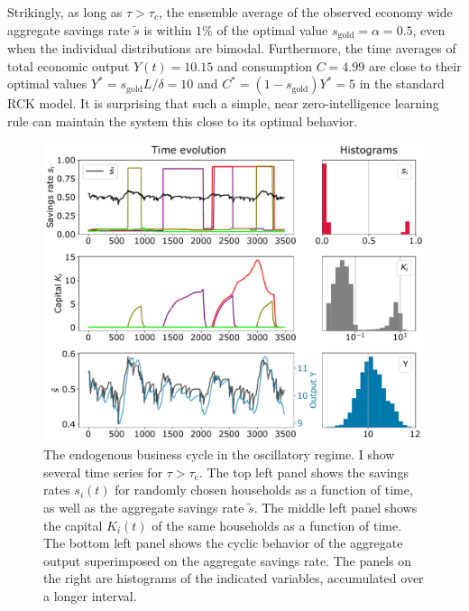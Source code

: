 Strikingly, as long as $\tau \! > \! \tau_{c}$, the ensemble average of the observed economy wide aggregate savings rate $\tilde{s}$ is within $1\%$ of the optimal value $s_\mathrm{gold}=\alpha=0.5$, even when the individual distributions are bimodal.
Furthermore, the time averages of total economic output $Y(t) \!=\! 10.15$ and  consumption $C \! = \! 4.99$ are close to their optimal values $Y^\ast \! = \! s_\mathrm{gold} L/\delta \! = \! 10$  and $C^\ast \! = \! (1-s_\mathrm{gold})Y^\ast \! = \! 5$  in the standard RCK model.  It is surprising that such a simple, near zero-intelligence learning rule can maintain the system this close to its optimal behavior.
\begin{figure}[t]
     \centering
       \includegraphics[width=0.99\linewidth]
       {figures/fig2.pdf}
	\caption{{ The endogenous business cycle in the oscillatory regime}.   I show several time series for $\tau \!>\! \tau_\mathrm{c}$.  
	The top left panel shows the savings rates $s_i(t)$ for randomly chosen households as a function of time, as well as the aggregate savings rate $\tilde{s}$.  
	The middle left panel shows the capital $K_i(t)$ of the same households as a function of time. The bottom left panel shows the cyclic behavior of the aggregate output superimposed on the aggregate savings rate.  The panels on the right are histograms of the indicated variables, accumulated over a longer interval.}
   \label{fig:micro_trajs}
\end{figure}

